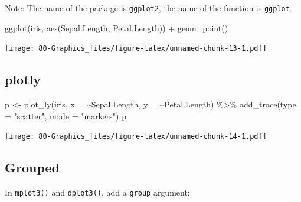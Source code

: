\documentclass[
]{book}
\newenvironment{Shaded}{\begin{snugshade}}{\end{snugshade}}
\newcommand{\AttributeTok}[1]{\textcolor[rgb]{0.77,0.63,0.00}{#1}}
\newcommand{\FunctionTok}[1]{\textcolor[rgb]{0.00,0.00,0.00}{#1}}
\newcommand{\NormalTok}[1]{#1}
\newcommand{\OtherTok}[1]{\textcolor[rgb]{0.56,0.35,0.01}{#1}}
\newcommand{\SpecialCharTok}[1]{\textcolor[rgb]{0.00,0.00,0.00}{#1}}
\newcommand{\StringTok}[1]{\textcolor[rgb]{0.31,0.60,0.02}{#1}}
\begin{document}
Note: The name of the package is \texttt{ggplot2}, the name of the function is \texttt{ggplot}.

\begin{Shaded}
\begin{Highlighting}[]
\FunctionTok{ggplot}\NormalTok{(iris, }\FunctionTok{aes}\NormalTok{(Sepal.Length, Petal.Length)) }\SpecialCharTok{+} \FunctionTok{geom\_point}\NormalTok{()}
\end{Highlighting}
\end{Shaded}

\texttt{[image: 80-Graphics\_files/figure-latex/unnamed-chunk-13-1.pdf]}

\hypertarget{plotly}{%
\subsection{\texorpdfstring{\textbf{plotly}}{plotly}}\label{plotly}}

\begin{Shaded}
\begin{Highlighting}[]
\NormalTok{p }\OtherTok{\textless{}{-}} \FunctionTok{plot\_ly}\NormalTok{(iris, }\AttributeTok{x =} \SpecialCharTok{\textasciitilde{}}\NormalTok{Sepal.Length, }\AttributeTok{y =} \SpecialCharTok{\textasciitilde{}}\NormalTok{Petal.Length) }\SpecialCharTok{\%\textgreater{}\%} 
  \FunctionTok{add\_trace}\NormalTok{(}\AttributeTok{type =} \StringTok{"scatter"}\NormalTok{, }\AttributeTok{mode =} \StringTok{"markers"}\NormalTok{)}
\NormalTok{p}
\end{Highlighting}
\end{Shaded}

\texttt{[image: 80-Graphics\_files/figure-latex/unnamed-chunk-14-1.pdf]}

\hypertarget{grouped}{%
\subsection{Grouped}\label{grouped}}

In \texttt{mplot3()} and \texttt{dplot3()}, add a \texttt{group} argument:

\begin{Shaded}
\end{Shaded}
\end{document}
